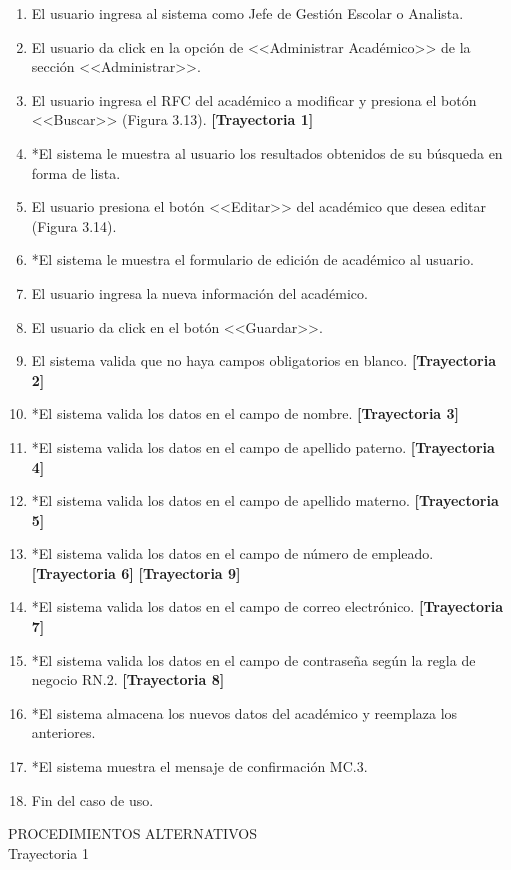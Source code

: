 \begin{enumerate}
	\item El usuario ingresa al sistema como Jefe de Gestión Escolar o Analista.
	\item El usuario da click en la opción de <<Administrar Académico>> de la sección <<Administrar>>.
	\item El usuario ingresa el RFC del académico a modificar y presiona el botón <<Buscar>> (Figura 3.13).
	\textbf{[Trayectoria 1]}
	\item *El sistema le muestra al usuario los resultados obtenidos de su búsqueda en forma de lista.
	\item El usuario presiona el botón <<Editar>> del académico que desea editar (Figura 3.14).
	\item *El sistema le muestra el formulario de edición de académico al usuario.
	\item El usuario ingresa la nueva información del académico.
	\item El usuario da click en el botón <<Guardar>>.
	\item El sistema valida que no haya campos obligatorios en blanco. \textbf{[Trayectoria 2]}
	\item *El sistema valida los datos en el campo de nombre. \textbf{[Trayectoria 3]}
	\item *El sistema valida los datos en el campo de apellido paterno. \textbf{[Trayectoria 4]}
	\item *El sistema valida los datos en el campo de apellido materno. \textbf{[Trayectoria 5]}
	\item *El sistema valida los datos en el campo de número de empleado. \textbf{[Trayectoria 6]} \textbf{[Trayectoria 9]}
	\item *El sistema valida los datos en el campo de correo electrónico. \textbf{[Trayectoria 7]}
	\item *El sistema valida los datos en el campo de contraseña según la regla de negocio RN.2. \textbf{[Trayectoria 8]}
	\item *El sistema almacena los nuevos datos del académico y reemplaza los anteriores.
	\item *El sistema muestra el mensaje de confirmación MC.3.
	\item Fin del caso de uso.
\end{enumerate}
\vspace*{1cm}
\Large{PROCEDIMIENTOS ALTERNATIVOS}\\
\large{Trayectoria 1}\\
